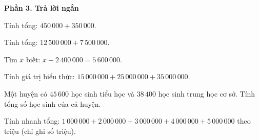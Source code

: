 \textbf{Phần 3. Trả lời ngắn}

\begin{ex} %
Tính tổng: $450\,000 + 350\,000$.
\end{ex}

\begin{ex} %
Tính tổng: $12\,500\,000 + 7\,500\,000$.
\end{ex}

\begin{ex} %
Tìm $x$ biết: $x - 2\,400\,000 = 5\,600\,000$.
\end{ex}

\begin{ex} %
Tính giá trị biểu thức: $15\,000\,000 + 25\,000\,000 + 35\,000\,000$.
\end{ex}

\begin{ex} %
Một huyện có $45\,600$ học sinh tiểu học và $38\,400$ học sinh trung học cơ sở. Tính tổng số học sinh của cả huyện.
\end{ex}

\begin{ex} %
Tính nhanh tổng: $1\,000\,000 + 2\,000\,000 + 3\,000\,000 + 4\,000\,000 + 5\,000\,000$ theo triệu (chỉ ghi số triệu).
\end{ex}
